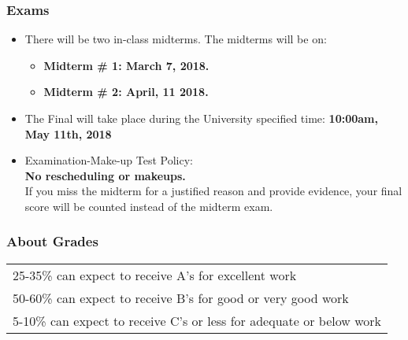 \documentclass[10pt]{beamer}
\begin{document}

\begin{frame}[t]
\frametitle{Exams}
\begin{itemize}
\item There will be two in-class midterms. The midterms will be on:
\begin{itemize}
\medskip
\item\textbf{Midterm \# 1: March 7, 2018.}
\medskip
\item\textbf{Midterm \# 2: April, 11 2018.}
\end{itemize}
\bigskip
\item The Final will take place during the University specified time: \textbf{10:00am, May 11th, 2018}
\bigskip
\item Examination-Make-up Test Policy:\\
\medskip
\textbf{No rescheduling or makeups.}\\
\medskip
If you miss the midterm for a justified reason and provide
evidence, your final score will be counted instead of the midterm exam.
\end{itemize}
\end{frame}
\begin{frame}[t]
\frametitle{About Grades}
\bigskip
\begin{table}[t]
\setlength {\tabcolsep}{3.75mm}
\vspace{0.01cm}
\renewcommand{\arraystretch}{1.75}
\begin{center}
\begin{tabular}{l}
\hline
25-35\% can expect to receive A's for excellent work \\
50-60\% can expect to receive B's for good or very good work \\
5-10\% can expect to receive C's or less for adequate or below work \\
\hline
\end{tabular}
\end{center}
\end{table}
\end{frame}

\end{document}
